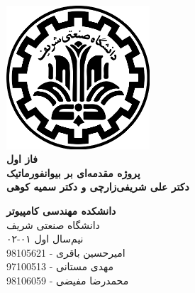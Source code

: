 \documentclass{article}
\begin{document}
\begin{titlepage}
	\begin{center}
		\vspace{0.2cm}
		
		\includegraphics[width=0.4\textwidth]{sharif.png}\\
		\vspace{0.5cm}
		\textbf{ \Huge{فاز اول}}\\
		\vspace{0.25cm}
		\textbf{ \Large{پروژه مقدمه‌ای بر بیوانفورماتیک \\ دکتر علی  شریفی‌زارچی و دکتر سمیه کوهی}}
		\vspace{0.2cm}
		
		
		\large \textbf{دانشکده مهندسی کامپیوتر}\\\vspace{0.1cm}
		\large   دانشگاه صنعتی شریف\\\vspace{0.2cm}
		\large   ﻧﯿﻢ‌سال اول ۰۱-۰۲ \\\vspace{0.2cm}
		\large{\Large{امیرحسین باقری - 98105621}}\\
		\large{\Large{مهدی مستانی - 97100513}}\\
		\large{\Large{محمدرضا مفیضی - 98106059}}\\
	\end{center}
\end{titlepage}

\newpage
\tableofcontents
\newpage
\pagestyle{fancy}
\fancyhf{}
\fancyfoot{}
\setlength{\headheight}{59pt}
\cfoot{\thepage}
\end{document}

